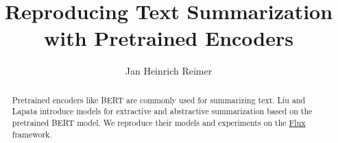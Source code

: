 \documentclass[english,sigconf,nonacm,screen,review]{acmart}
\title{Reproducing Text Summarization with Pretrained Encoders}
\author{Jan Heinrich Reimer}
\affiliation{
    \institution{Martin Luther University Halle-Wittenberg}
    \streetaddress{Von-Seckendorff-Platz~1}
    \postcode{06108}
    \city{Halle (Saale)}
    \country{Germany}
}
\begin{document}
\begin{abstract}
    Pretrained encoders like BERT are commonly used for summarizing text. Liu and Lapata introduce models for extractive and abstractive summarization based on the pretrained BERT model.
    We reproduce their models and experiments on the \href{https://fluxml.ai/}{Flux} framework.
\end{abstract}

\maketitle
\end{document}

